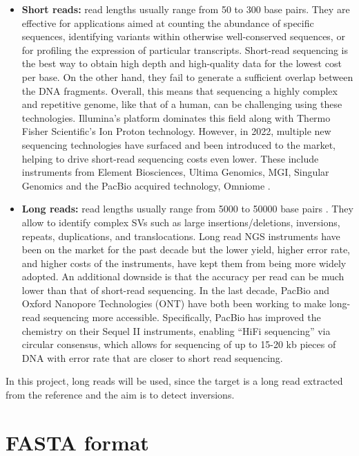 \begin{itemize}
\item \textbf{Short reads: } read lengths usually range from 50 to 300 base pairs. They are effective for applications aimed at counting the abundance of specific sequences, identifying variants within otherwise well-conserved sequences, or for profiling the expression of particular transcripts. Short-read sequencing is the best way to obtain high depth and high-quality data for the lowest cost per base. On the other hand, they fail to generate a sufficient overlap between the DNA fragments. Overall, this means that sequencing a highly complex and repetitive genome, like that of a human, can be challenging using these technologies. Illumina’s platform dominates this field along with Thermo Fisher Scientific’s Ion Proton technology. However, in 2022, multiple new sequencing technologies have surfaced and been introduced to the market, helping to drive short-read sequencing costs even lower. These include instruments from Element Biosciences, Ultima Genomics, MGI, Singular Genomics and the PacBio acquired technology, Omniome \cite{noauthor_long-read_nodate}. 
\item \textbf{Long reads: } read lengths usually range from 5000 to 50000 base pairs \cite{lee_error_2014}. They allow to identify complex SVs such as large insertions/deletions, inversions, repeats, duplications, and translocations. Long read NGS instruments have been on the market for the past decade but the lower yield, higher error rate, and higher costs of the instruments, have kept them from being more widely adopted. An additional downside is that the accuracy per read can be much lower than that of short-read sequencing. In the last decade, PacBio and Oxford Nanopore Technologies (ONT) have both been working to make long-read sequencing more accessible. Specifically, PacBio has improved the chemistry on their Sequel II instruments, enabling “HiFi sequencing” via circular consensus, which allows for sequencing of up to 15-20 kb pieces of DNA with error rate that are closer to short read sequencing.

\end{itemize}

In this project, long reads will be used, since the target is a long read extracted from the reference and the aim is to detect inversions. 

\section{FASTA format}

